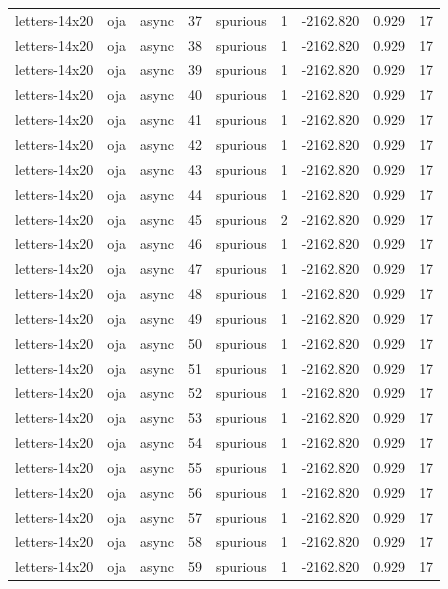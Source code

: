 \begin{tabular}{lllrlrrrr}
letters-14x20 & oja & async & 37 & spurious & 1 & -2162.820 & 0.929 & 17 \\
letters-14x20 & oja & async & 38 & spurious & 1 & -2162.820 & 0.929 & 17 \\
letters-14x20 & oja & async & 39 & spurious & 1 & -2162.820 & 0.929 & 17 \\
letters-14x20 & oja & async & 40 & spurious & 1 & -2162.820 & 0.929 & 17 \\
letters-14x20 & oja & async & 41 & spurious & 1 & -2162.820 & 0.929 & 17 \\
letters-14x20 & oja & async & 42 & spurious & 1 & -2162.820 & 0.929 & 17 \\
letters-14x20 & oja & async & 43 & spurious & 1 & -2162.820 & 0.929 & 17 \\
letters-14x20 & oja & async & 44 & spurious & 1 & -2162.820 & 0.929 & 17 \\
letters-14x20 & oja & async & 45 & spurious & 2 & -2162.820 & 0.929 & 17 \\
letters-14x20 & oja & async & 46 & spurious & 1 & -2162.820 & 0.929 & 17 \\
letters-14x20 & oja & async & 47 & spurious & 1 & -2162.820 & 0.929 & 17 \\
letters-14x20 & oja & async & 48 & spurious & 1 & -2162.820 & 0.929 & 17 \\
letters-14x20 & oja & async & 49 & spurious & 1 & -2162.820 & 0.929 & 17 \\
letters-14x20 & oja & async & 50 & spurious & 1 & -2162.820 & 0.929 & 17 \\
letters-14x20 & oja & async & 51 & spurious & 1 & -2162.820 & 0.929 & 17 \\
letters-14x20 & oja & async & 52 & spurious & 1 & -2162.820 & 0.929 & 17 \\
letters-14x20 & oja & async & 53 & spurious & 1 & -2162.820 & 0.929 & 17 \\
letters-14x20 & oja & async & 54 & spurious & 1 & -2162.820 & 0.929 & 17 \\
letters-14x20 & oja & async & 55 & spurious & 1 & -2162.820 & 0.929 & 17 \\
letters-14x20 & oja & async & 56 & spurious & 1 & -2162.820 & 0.929 & 17 \\
letters-14x20 & oja & async & 57 & spurious & 1 & -2162.820 & 0.929 & 17 \\
letters-14x20 & oja & async & 58 & spurious & 1 & -2162.820 & 0.929 & 17 \\
letters-14x20 & oja & async & 59 & spurious & 1 & -2162.820 & 0.929 & 17 \\

\end{tabular}
